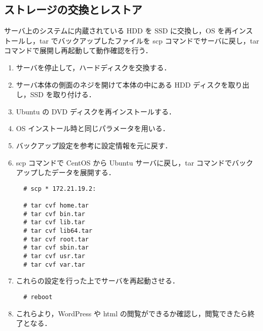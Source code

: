 \documentclass[a4j,titlepage]{jarticle}
\begin{document}
\begin{enumerate}
\subsection{ストレージの交換とレストア}
サーバ上のシステムに内蔵されている HDD を SSD に交換し，OS を再インストールし，tar でバックアップしたファイルを scp コマンドでサーバに戻し，tar コマンドで展開し再起動して動作確認を行う．

\begin{enumerate}
\item サーバを停止して，ハードディスクを交換する．
  
\item サーバ本体の側面のネジを開けて本体の中にある HDD ディスクを取り出し，SSD を取り付ける．

\item Ubuntu の DVD ディスクを再インストールする．
  
\item OS インストール時と同じパラメータを用いる．

\item バックアップ設定を参考に設定情報を元に戻す．

\item scp コマンドで CentOS から Ubuntu サーバに戻し，tar コマンドでバックアップしたデータを展開する．

  \begin{center}
    \begin{screen}
\begin{verbatim}
  # scp * 172.21.19.2:

  # tar cvf home.tar 
  # tar cvf bin.tar
  # tar cvf lib.tar
  # tar cvf lib64.tar
  # tar cvf root.tar 
  # tar cvf sbin.tar
  # tar cvf usr.tar
  # tar cvf var.tar
\end{verbatim}
    \end{screen}
    \end{center}

    \item これらの設定を行った上でサーバを再起動させる．

  \begin{center}
    \begin{screen}
\begin{verbatim}
  # reboot 
\end{verbatim}
    \end{screen}
    \end{center}

\item これらより，WordPress や html の閲覧ができるか確認し，閲覧できたら終了となる．
      

\end{enumerate}
\end{enumerate}
\end{document}

